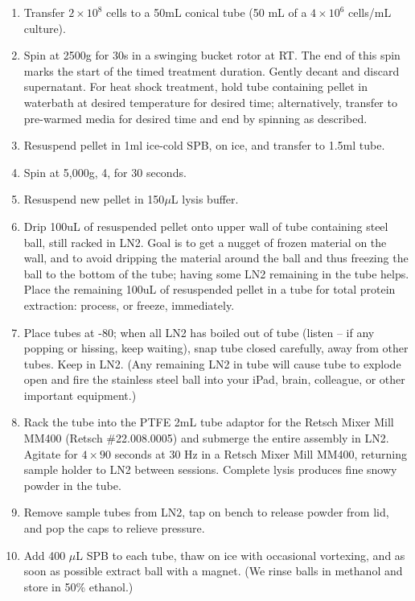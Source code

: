 \documentclass{article}
\newcommand{\mul}{\ensuremath{\mu}L\xspace}
\newcommand{\degC}{\celsius\xspace}
\begin{document}
\begin{enumerate}[resume]
\item Transfer $2 \times 10^8$ cells to a 50mL conical tube (50 mL of a $4 \times 10^6$ cells/mL culture). 
\item Spin at 2500g for 30s in a swinging bucket rotor at RT. The end of this spin marks the start of the timed treatment duration. Gently decant and discard supernatant. For heat shock treatment, hold tube containing pellet in waterbath at desired temperature for desired time; alternatively, transfer to pre-warmed media for desired time and end by spinning as described.

\item Resuspend pellet in 1ml ice-cold SPB, on ice, and transfer to 1.5ml tube.
\item Spin at 5,000g, 4\degC, for 30 seconds.
\item Resuspend new pellet in 150\mul lysis buffer.
\item \label{step:flashfreeze} 
Drip 100uL of resuspended pellet onto upper wall of tube containing steel ball, still racked in LN2. Goal is to get a nugget of frozen material on the wall, and to avoid dripping the material around the ball and thus freezing the ball to the bottom of the tube; having some LN2 remaining in the tube helps.  Place the remaining 100uL of resuspended pellet in a tube for total protein extraction: process, or freeze, immediately. 
\item Place tubes at -80\degC; when all LN2 has boiled out of tube (listen -- if any popping or hissing, keep waiting), snap tube closed carefully, away from other tubes. Keep in LN2. (Any remaining LN2 in tube will cause tube to explode open and fire the stainless steel ball into your iPad, brain, colleague, or other important equipment.)
\item Rack the tube into the PTFE 2mL tube adaptor for the Retsch Mixer Mill MM400 (Retsch \#22.008.0005) and submerge the entire assembly in LN2.
Agitate for $4\times 90$ seconds at 30 Hz in a Retsch Mixer Mill MM400, returning sample holder to LN2 between sessions. Complete lysis produces fine snowy powder in the tube.
\item  \label{step:powder} 
Remove sample tubes from LN2, tap on bench to release powder from lid, and pop the caps to relieve pressure. 
\item Add 400 \mul SPB to each tube, thaw on ice with occasional vortexing, and as soon as possible extract ball with a magnet. (We rinse balls in methanol and store in 50\% ethanol.)
\end{enumerate}
\end{document}
